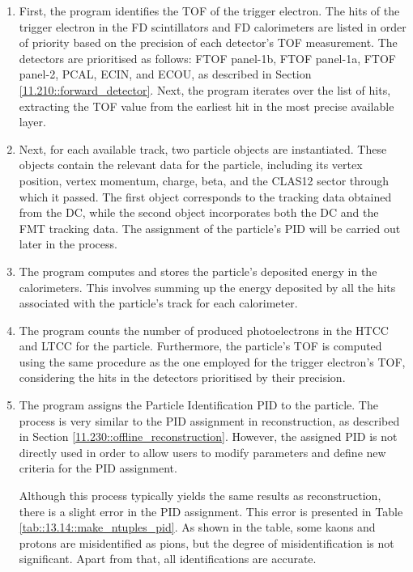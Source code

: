     \begin{enumerate}
        \item
            First, the program identifies the TOF of the trigger electron.
            The hits of the trigger electron in the FD scintillators and FD calorimeters are listed in order of priority based on the precision of each detector's TOF measurement.
            The detectors are prioritised as follows: FTOF panel-1b, FTOF panel-1a, FTOF panel-2, PCAL, ECIN, and ECOU, as described in Section \ref{11.210::forward_detector}.
            Next, the program iterates over the list of hits, extracting the TOF value from the earliest hit in the most precise available layer.

        \item
            Next, for each available track, two particle objects are instantiated.
            These objects contain the relevant data for the particle, including its vertex position, vertex momentum, charge, beta, and the CLAS12 sector through which it passed.
            The first object corresponds to the tracking data obtained from the DC, while the second object incorporates both the DC and the FMT tracking data.
            The assignment of the particle's PID will be carried out later in the process.

        \item
            The program computes and stores the particle's deposited energy in the calorimeters.
            This involves summing up the energy deposited by all the hits associated with the particle's track for each calorimeter.

        \item
            The program counts the number of produced photoelectrons in the HTCC and LTCC for the particle.
            Furthermore, the particle's TOF is computed using the same procedure as the one employed for the trigger electron's TOF, considering the hits in the detectors prioritised by their precision.

        \item
            The program assigns the Particle Identification PID to the particle.
            The process is very similar to the PID assignment in reconstruction, as described in Section \ref{11.230::offline_reconstruction}.
            However, the assigned PID is not directly used in order to allow users to modify parameters and define new criteria for the PID assignment.

            Although this process typically yields the same results as reconstruction, there is a slight error in the PID assignment.
            This error is presented in Table \ref{tab::13.14::make_ntuples_pid}.
            As shown in the table, some kaons and protons are misidentified as pions, but the degree of misidentification is not significant.
            Apart from that, all identifications are accurate.


\end{enumerate}
